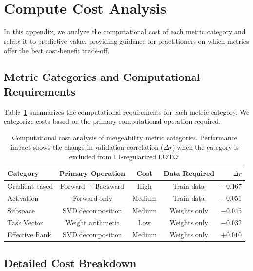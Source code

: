 \section{Compute Cost Analysis}
\label{appendix:compute_cost}

In this appendix, we analyze the computational cost of each metric category and relate it to predictive value, providing guidance for practitioners on which metrics offer the best cost-benefit trade-off.

\subsection{Metric Categories and Computational Requirements}

Table~\ref{tab:compute_cost} summarizes the computational requirements for each metric category. We categorize costs based on the primary computational operation required.

\begin{table}[h]
\centering
\caption{Computational cost analysis of mergeability metric categories. Performance impact shows the change in validation correlation ($\Delta r$) when the category is excluded from L1-regularized LOTO.}
\label{tab:compute_cost}
\begin{tabular}{@{}lcccr@{}}
\toprule
\textbf{Category} & \textbf{Primary Operation} & \textbf{Cost} & \textbf{Data Required} & \textbf{$\Delta r$} \\
\midrule
Gradient-based & Forward + Backward & High & Train data & $-0.167$ \\
Activation & Forward only & Medium & Train data & $-0.051$ \\
Subspace & SVD decomposition & Medium & Weights only & $-0.045$ \\
Task Vector & Weight arithmetic & Low & Weights only & $-0.032$ \\
Effective Rank & SVD decomposition & Medium & Weights only & $+0.010$ \\
\bottomrule
\end{tabular}
\end{table}

\subsection{Detailed Cost Breakdown}

